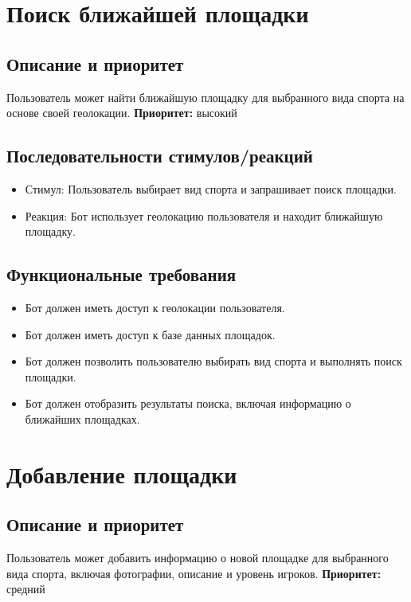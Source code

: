 \documentclass{scrreprt}
\begin{document}
\section{Поиск ближайшей площадки}

\subsection{Описание и приоритет}
Пользователь может найти ближайшую площадку для выбранного вида спорта на основе своей геолокации.
\newline
\textbf{Приоритет:} высокий

\subsection{Последовательности стимулов/реакций}
\begin{itemize}
    \item Стимул: Пользователь выбирает вид спорта и запрашивает поиск площадки.
    \item Реакция: Бот использует геолокацию пользователя и находит ближайшую площадку.
\end{itemize}

\subsection{Функциональные требования}
\begin{itemize}
    \item Бот должен иметь доступ к геолокации пользователя.
    \item Бот должен иметь доступ к базе данных площадок.
    \item Бот должен позволить пользователю выбирать вид спорта и выполнять поиск площадки.
    \item Бот должен отобразить результаты поиска, включая информацию о ближайших площадках.
\end{itemize}



\section{Добавление площадки}

\subsection{Описание и приоритет}
Пользователь может добавить информацию о новой площадке для выбранного вида спорта, включая фотографии, описание и уровень игроков.
\newline
\textbf{Приоритет:} средний
\end{document}
